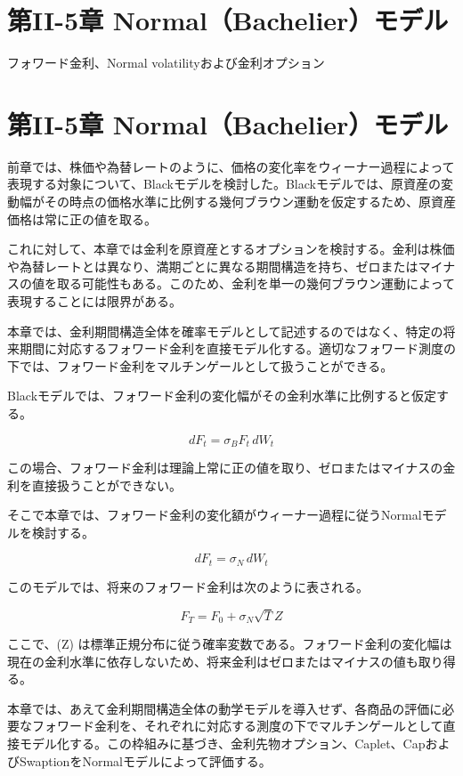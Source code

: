 \documentclass[
  letterpaper,
  DIV=11,
  numbers=noendperiod]{scrreprt}
\begin{document}
\chapter{第II-5章
Normal（Bachelier）モデル}\label{ux7b2cii-5ux7ae0-normalbachelierux30e2ux30c7ux30eb}

フォワード金利、Normal volatilityおよび金利オプション

\hfill\break

\chapter{第II-5章
Normal（Bachelier）モデル}\label{ux7b2cii-5ux7ae0-normalbachelierux30e2ux30c7ux30eb-1}

前章では、株価や為替レートのように、価格の変化率をウィーナー過程によって表現する対象について、Blackモデルを検討した。Blackモデルでは、原資産の変動幅がその時点の価格水準に比例する幾何ブラウン運動を仮定するため、原資産価格は常に正の値を取る。

これに対して、本章では金利を原資産とするオプションを検討する。金利は株価や為替レートとは異なり、満期ごとに異なる期間構造を持ち、ゼロまたはマイナスの値を取る可能性もある。このため、金利を単一の幾何ブラウン運動によって表現することには限界がある。

本章では、金利期間構造全体を確率モデルとして記述するのではなく、特定の将来期間に対応するフォワード金利を直接モデル化する。適切なフォワード測度の下では、フォワード金利をマルチンゲールとして扱うことができる。

Blackモデルでは、フォワード金利の変化幅がその金利水準に比例すると仮定する。

\[
dF_t
=
\sigma_B F_t\,dW_t
\]

この場合、フォワード金利は理論上常に正の値を取り、ゼロまたはマイナスの金利を直接扱うことができない。

そこで本章では、フォワード金利の変化額がウィーナー過程に従うNormalモデルを検討する。

\[
dF_t
=
\sigma_N\,dW_t
\]

このモデルでは、将来のフォワード金利は次のように表される。

\[
F_T
=
F_0
+
\sigma_N\sqrt{T}Z
\]

ここで、(Z)
は標準正規分布に従う確率変数である。フォワード金利の変化幅は現在の金利水準に依存しないため、将来金利はゼロまたはマイナスの値も取り得る。

本章では、あえて金利期間構造全体の動学モデルを導入せず、各商品の評価に必要なフォワード金利を、それぞれに対応する測度の下でマルチンゲールとして直接モデル化する。この枠組みに基づき、金利先物オプション、Caplet、CapおよびSwaptionをNormalモデルによって評価する。
\end{document}
